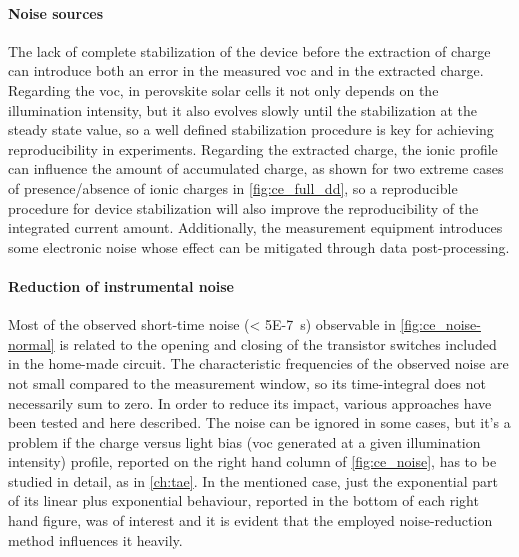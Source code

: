 	\paragraph{Noise sources} \label{ce_noise} The lack of complete stabilization of the device before the extraction of charge can introduce both an error in the measured \gls{voc} and in the extracted charge. Regarding the \gls{voc}, in perovskite solar cells it not only depends on the illumination intensity, but it also evolves slowly until the stabilization at the steady state value, so a well defined stabilization procedure is key for achieving reproducibility in  experiments. Regarding the extracted charge, the ionic profile can influence the amount of accumulated charge, as shown for two extreme cases of presence/absence of ionic charges in \cref{fig:ce_full_dd}, so a reproducible procedure for device stabilization will also improve the reproducibility of the integrated current amount. Additionally, the measurement equipment introduces some electronic noise whose effect can be mitigated through data post-processing.

	\paragraph{Reduction of instrumental noise}\label{r_ce_noise} Most of the observed short-time noise (\SI{< 5E-7}{\s}) observable in \cref{fig:ce_noise-normal} is related to the opening and closing of the transistor switches included in the home-made circuit. The characteristic frequencies of the observed noise are not small compared to the measurement window, so its time-integral does not necessarily sum to zero.
	In order to reduce its impact, various approaches have been tested and here described.
	The noise can be ignored in some cases, but it's a problem if the charge versus light bias (\gls{voc} generated at a given illumination intensity) profile, reported on the right hand column of \cref{fig:ce_noise}, has to be studied in detail, as in \cref{ch:tae}.
	In the mentioned case, just the exponential part of its linear plus exponential behaviour, reported in the bottom of each right hand figure, was of interest and it is evident that the employed noise-reduction method influences it heavily.
	
